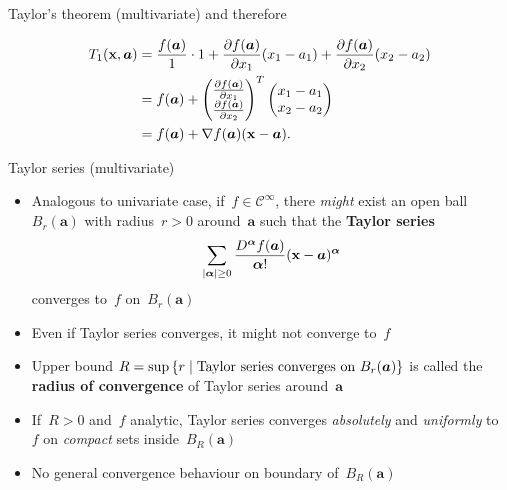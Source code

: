 \documentclass[11pt,compress,t,notes=noshow, xcolor=table]{beamer}
\begin{document}
\begin{vbframe}{Taylor's theorem (multivariate)}
and therefore

\vspace{-\baselineskip}

\begin{align*}
    T_1(\mathbf{x},\bm{a}) &= \frac{f(\bm{a})}{1} \cdot 1 + \frac{\partial f(\bm{a})}{\partial x_1} (x_1 - a_1) + \frac{\partial f(\bm{a})}{\partial x_2} (x_2 - a_2) \\
    &= f(\bm{a}) + \begin{pmatrix}\frac{\partial f(\bm{a})}{\partial x_1} \\ \frac{\partial f(\bm{a})}{\partial x_2}\end{pmatrix}^T \begin{pmatrix}x_1 - a_1 \\ x_2 - a_2\end{pmatrix} \\
    &= f(\bm{a}) + \nabla f(\bm{a}) (\mathbf{x} - \bm{a}).
\end{align*}

\end{vbframe}

\begin{vbframe}{Taylor series (multivariate)}

\begin{itemize}
    \item Analogous to univariate case, if~$f \in \mathcal{C}^\infty$, there \textit{might} exist an open ball~$B_r(\bm{a})$ with radius~$r>0$ around~$\bm{a}$ such that the \textbf{Taylor series}
        \begin{equation*}
            \sum_{|\bm{\alpha}| \geq 0} \frac{D^{\bm{\alpha}} f(\bm{a})}{{\bm{\alpha}}!} (\mathbf{x} - \bm{a})^{\bm{\alpha}}
        \end{equation*}
        converges to~$f$ on~$B_r(\bm{a})$
    \item Even if Taylor series converges, it might not converge to~$f$
    \item Upper bound $R = \sup \left\lbrace r \;|\; \textnormal{Taylor series converges on } B_r(\bm{a}) \right\rbrace$ is called the \textbf{radius of convergence} of Taylor series around~$\bm{a}$
    \item If~$R>0$ and~$f$ analytic, Taylor series converges \textit{absolutely} and \textit{uniformly} to~$f$ on \textit{compact} sets inside~$B_R(\bm{a})$
    \item No general convergence behaviour on boundary of~$B_R(\bm{a})$
\end{itemize}

\end{vbframe}

\endlecture
\end{document}
